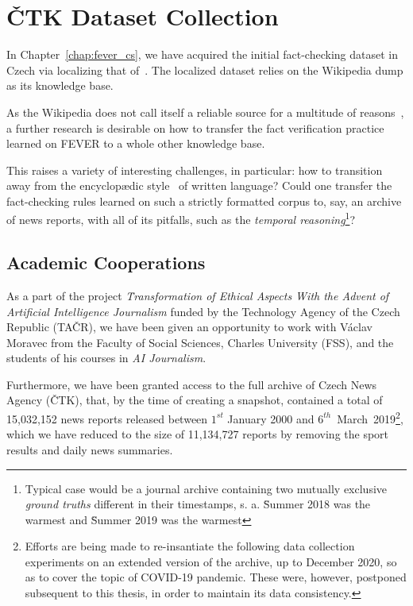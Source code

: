 
\chapter{ČTK Dataset Collection}
\label{chap:ctk}
In Chapter~\ref{chap:fever_cs}, we have acquired the initial fact-checking dataset in Czech via localizing that of~\cite{fever}. The localized dataset relies on the \textsf{Wikipedia} dump as its knowledge base.

As the \textsf{Wikipedia} does not call itself a reliable source for a multitude of reasons~\cite{wiki:reliable}, a further research is desirable on how to transfer the fact verification practice learned on \textsf{FEVER} to a whole other knowledge base.

This raises a variety of interesting challenges, in particular: how to transition away from the encyclop\ae{}dic style~\cite{wiki:style} of written language? Could one transfer the fact-checking rules learned on such a strictly formatted corpus to, say, an archive of {news reports}, with all of its pitfalls, such as the \textit{temporal reasoning}\footnote{Typical case would be a journal archive containing two mutually exclusive \textit{ground truths} different in their timestamps, s. a. \"{Summer 2018 was the warmest} and \"{Summer 2019 was the warmest}}?

\section{Academic Cooperations}
As a part of the project \textit{\"{Transformation of Ethical Aspects With the Advent of Artificial Intelligence Journalism}} funded by the \textsf{Technology Agency of the Czech Republic} (\textsf{TAČR}), we have been given an opportunity to work with Václav Moravec from the \textsf{Faculty of Social Sciences}, \textsf{Charles University} (\textsf{FSS}), and the students of his courses in \textit{AI Journalism}.

Furthermore, we have been granted access to the full archive of \textsf{Czech News Agency} (\textsf{ČTK}), that, by the time of creating a snapshot, contained a total of 15,032,152 news reports released between $1^{st}$ January 2000 and $6^{th}$~March~2019\footnote{Efforts are being made to re-insantiate the following data collection experiments on an extended version of the archive, up to December 2020, so as to cover the topic of COVID-19 pandemic. These were, however, postponed subsequent to this thesis, in order to maintain its data consistency.}, which we have reduced to the size of 11,134,727 reports by removing the sport results and daily news summaries.

